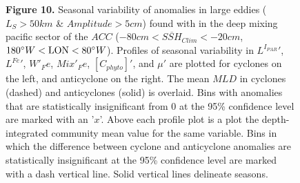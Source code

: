 \documentclass{article}
\begin{document}
\begin{figure}[!htbp]
\vspace*{-2.5cm}
\begin{adjustwidth}{-1in}{-1in}
 \centering
\end{adjustwidth}
\caption[Seasonal variability of eddy anomalies in the deep mixing $ACC$]
{\textbf{Figure 10.} Seasonal variability of anomalies in large eddies ($L_S>50km$ \& $Amplitude>5cm$) found with in the deep mixing pacific sector of the $ACC$ ($-80cm<\overline{SSH}_{Clim}<-20cm$, $180\degree W<\textrm{LON}< 80\degree W$). Profiles of seasonal variability in $L^{I_{PAR}}'$, $L^{Fe}'$, $W'_Fe$, $Mix'_Fe$, $[C_{phyto}]'$, and $\mu'$ are plotted for cyclones on the left, and anticyclone on the right. The mean $MLD$ in cyclones (dashed) and anticyclones (solid) is overlaid. Bins with anomalies that are statistically insignificant from 0 at the 95\% confidence level are marked with an '$x$'. Above each profile plot is a plot the depth-integrated community mean value for the same variable. Bins in which the difference between cyclone and anticyclone anomalies are statistically insignificant at the 95\% confidence level are marked with a dash vertical line. Solid vertical lines delineate seasons.  
}
\label{fig:Fig10}
\end{figure}




\end{document}
